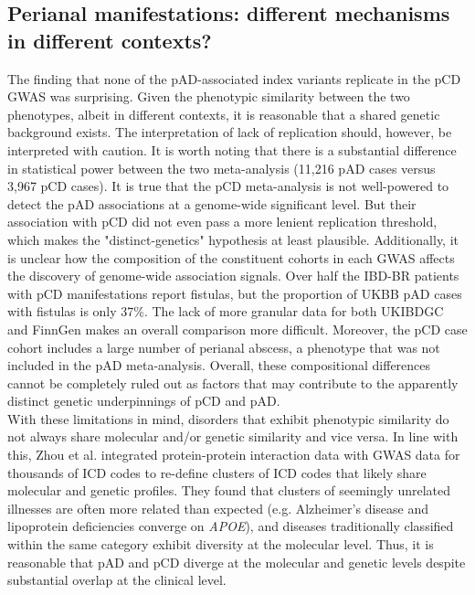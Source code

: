 \subsection{Perianal manifestations: different mechanisms in different contexts?}
The finding that none of the pAD-associated index variants replicate in the pCD GWAS was surprising. Given the phenotypic similarity between the two phenotypes, albeit in different contexts, it is reasonable that a shared genetic background exists. The interpretation of lack of replication should, however, be interpreted with caution. It is worth noting that there is a substantial difference in statistical power between the two meta-analysis (11,216 pAD cases versus 3,967 pCD cases). It is true that the pCD meta-analysis is not well-powered to detect the pAD associations at a genome-wide significant level. But their association with pCD did not even pass a more lenient replication threshold, which makes the "distinct-genetics" hypothesis at least plausible. Additionally, it is unclear how the composition of the constituent cohorts in each GWAS affects the discovery of genome-wide association signals. Over half the IBD-BR patients with pCD manifestations report fistulas, but the proportion of UKBB pAD cases with fistulas is only 37\%. The lack of more granular data for both UKIBDGC and FinnGen makes an overall comparison more difficult. Moreover, the pCD case cohort includes a large number of perianal abscess, a phenotype that was not included in the pAD meta-analysis. Overall, these compositional differences cannot be completely ruled out as factors that may contribute to the apparently distinct genetic underpinnings of pCD and pAD.\\


With these limitations in mind, disorders that exhibit phenotypic similarity do not always share molecular and/or genetic similarity and vice versa. In line with this, Zhou et al. \cite{Zhou2018-tp} integrated protein-protein interaction data with GWAS data for thousands of ICD codes to re-define clusters of ICD codes that likely share molecular and genetic profiles. They found that clusters of seemingly unrelated illnesses are often more related than expected (e.g. Alzheimer's disease and lipoprotein deficiencies converge on \textit{APOE}), and diseases traditionally classified within the same category exhibit diversity at the molecular level. Thus, it is reasonable that pAD and pCD diverge at the molecular and genetic levels despite substantial overlap at the clinical level. 

